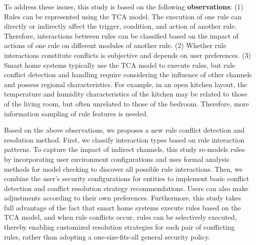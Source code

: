 
To address these issues, this study is based on the following \textbf{observations}: (1) Rules can be represented using the TCA model. The execution of one rule can directly or indirectly affect the trigger, condition, and action of another rule. Therefore, interactions between rules can be classified based on the impact of actions of one rule on different modules of another rule. (2) Whether rule interactions constitute conflicts is subjective and depends on user preferences. (3) Smart home systems typically use the TCA model to execute rules, but rule conflict detection and handling require considering the influence of other channels and possess regional characteristics. For example, in an open kitchen layout, the temperature and humidity characteristics of the kitchen may be related to those of the living room, but often unrelated to those of the bedroom. Therefore, more information sampling of rule features is needed.


Based on the above observations, we proposes a new rule conflict detection and resolution method. First, we classify interaction types based on rule interaction patterns. To capture the impact of indirect channels, this study re-models rules by incorporating user environment configurations and uses formal analysis methods for model checking to discover all possible rule interactions. Then, we combine the user's security configurations for entities to implement basic conflict detection and conflict resolution strategy recommendations. Users can also make adjustments according to their own preferences. Furthermore, this study takes full advantage of the fact that smart home systems execute rules based on the TCA model, and when rule conflicts occur, rules can be selectively executed, thereby enabling customized resolution strategies for each pair of conflicting rules, rather than adopting a one-size-fits-all general security policy.

